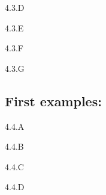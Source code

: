 \begin{exercise}{4.3.D}

\end{exercise}
\begin{solution}
    \todo{}
\end{solution}

\begin{exercise}{4.3.E}

\end{exercise}
\begin{solution}
    \todo{}
\end{solution}

\begin{exercise}{4.3.F}

\end{exercise}
\begin{solution}
    \todo{}
\end{solution}

\begin{exercise}{4.3.G}
\end{exercise}
\begin{solution}
    \todo{}
\end{solution}

\subsection{First examples:}
\begin{exercise}{4.4.A}

\end{exercise}
\begin{solution}
    \todo{}
\end{solution}

\begin{exercise}{4.4.B}

\end{exercise}
\begin{solution}
    \todo{}
\end{solution}

\begin{exercise}{4.4.C}

\end{exercise}
\begin{solution}
    \todo{}
\end{solution}

\begin{exercise}{4.4.D}

\end{exercise}
\begin{solution}
    \todo{}
\end{solution}

